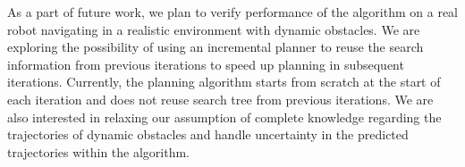 As a part of future work, we plan to verify performance of the algorithm on a real robot navigating in a realistic environment with dynamic obstacles. We are exploring the possibility of using an incremental planner to reuse the search information from previous iterations to speed up planning in subsequent iterations. Currently, the planning algorithm starts from scratch at the start of each iteration and does not reuse search tree from previous iterations. We are also interested in relaxing our assumption of complete knowledge regarding the trajectories of dynamic obstacles and handle uncertainty in the predicted trajectories within the algorithm. 


